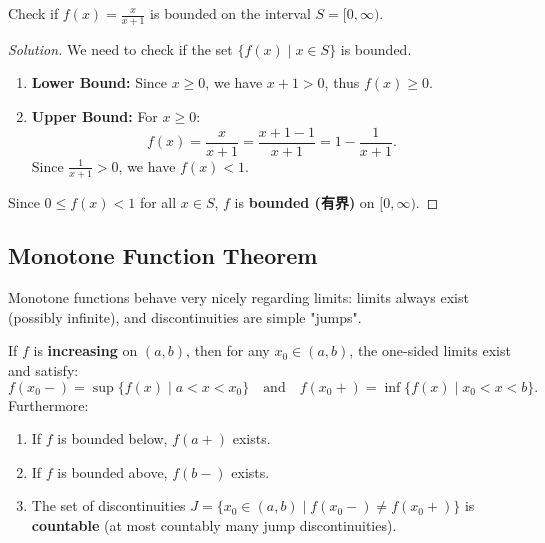 \documentclass[
	UTF-8,
	11pt, %
	a4paper, %
]{LegrandOrangeBook}
\begin{document}
    \begin{example}
    Check if $f(x) = \frac{x}{x+1}$ is bounded on the interval $S = [0, \infty)$.

    \begin{proof}[Solution]
        We need to check if the set $\{ f(x) \mid x \in S \}$ is bounded.
        \begin{enumerate}
        \item \textbf{Lower Bound:} Since $x \ge 0$, we have $x+1 > 0$, thus $f(x) \ge 0$.
        \item \textbf{Upper Bound:} For $x \ge 0$:
        \[ f(x) = \frac{x}{x+1} = \frac{x+1-1}{x+1} = 1 - \frac{1}{x+1}. \]
        Since $\frac{1}{x+1} > 0$, we have $f(x) < 1$.
    \end{enumerate}
    Since $0 \le f(x) < 1$ for all $x \in S$, $f$ is \textbf{bounded (有界)} on $[0, \infty)$.
    \end{proof}
    \end{example}

    \newpage

    \subsection{Monotone Function Theorem}

    Monotone functions behave very nicely regarding limits: limits always exist (possibly infinite), and discontinuities are simple "jumps".

    \begin{theorem}
    If $f$ is \textbf{increasing} on $(a, b)$, then for any $x_0 \in (a, b)$, the one-sided limits exist and satisfy:
    \[ f(x_0-) = \sup \{ f(x) \mid a < x < x_0 \} \quad \text{and} \quad f(x_0+) = \inf \{ f(x) \mid x_0 < x < b \}. \]
    Furthermore:
    \begin{enumerate}
        \item If $f$ is bounded below, $f(a+)$ exists.
        \item If $f$ is bounded above, $f(b-)$ exists.
        \item The set of discontinuities $J = \{ x_0 \in (a, b) \mid f(x_0-) \neq f(x_0+) \}$ is \textbf{countable} (at most countably many jump discontinuities).
    \end{enumerate}
    \end{theorem}
\end{document}
